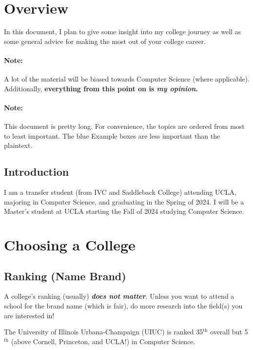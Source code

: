 \documentclass[11pt]{article}
\newenvironment{example}{
\begin{tcolorbox}[title=Example, colback=blue!5!white, colframe=black!75!blue]
}{ \end{tcolorbox} }
\renewcommand{\it}[1]{\textit{{#1}}}
\renewcommand{\bf}[1]{\textbf{{#1}}}
\newcommand{\ib}[1]{\textit{\textbf{{#1}}}}
\renewcommand{\th}{$^{\text{th}}$ }
\begin{document}
\tableofcontents
\newpage

\section{Overview}
\label{sec:overview}
In this document, I plan to give some insight into my college journey as well as
some general advice for making the most out of your college career.

\paragraph{Note:} A lot of the material will be biased towards Computer Science
(where applicable). Additionally, \bf{everything from this point
on is \it{my opinion}.}

\vspace{-1em}
\paragraph{Note:} This document is pretty long. For convenience, the topics are
ordered from most to least important. The blue Example boxes are less important
than the plaintext.

\subsection{Introduction}
I am a transfer student (from IVC and Saddleback College) attending UCLA,
majoring in Computer Science, and graduating in the Spring of 2024. I will be a
Master's student at UCLA starting the Fall of 2024 studying Computer Science.

\section{Choosing a College}

\subsection{Ranking (Name Brand)}
A college's ranking (usually) \ib{does not matter}. Unless you want to attend a
school for the brand name (which is fair), do more research into the field(s)
you are interested in!
\begin{example}
  The University of Illinois Urbana-Champaign (UIUC) is ranked 35\th overall
  but 5\th (above Cornell, Princeton, and UCLA!) in Computer Science.
\end{example}
\end{document}
